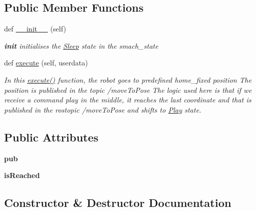 \subsection*{Public Member Functions}
\begin{DoxyCompactItemize}
\item 
def \hyperlink{classstate__behavior_1_1Sleep_a6550cf2697cc65d83162891ad194fe2d}{\+\_\+\+\_\+init\+\_\+\+\_\+} (self)
\begin{DoxyCompactList}\small\item\em {\bfseries init} initialises the \hyperlink{classstate__behavior_1_1Sleep}{Sleep} state in the smach\+\_\+state \end{DoxyCompactList}\item 
def \hyperlink{classstate__behavior_1_1Sleep_a79cf281b29f33265acc97354865a2f3c}{execute} (self, userdata)
\begin{DoxyCompactList}\small\item\em In this \hyperlink{classstate__behavior_1_1Sleep_a79cf281b29f33265acc97354865a2f3c}{execute()} function, the robot goes to predefined home\+\_\+fixed position The position is published in the topic /move\+To\+Pose The logic used here is that if we receive a command play in the middle, it reaches the last coordinate and that is published in the rostopic /move\+To\+Pose and shifts to \hyperlink{classstate__behavior_1_1Play}{Play} state. \end{DoxyCompactList}\end{DoxyCompactItemize}
\subsection*{Public Attributes}
\begin{DoxyCompactItemize}
\item 
\mbox{\label{classstate__behavior_1_1Sleep_abd6af3621ac6fd6caab94e5ebd1d87ad}} 
{\bfseries pub}
\item 
\mbox{\label{classstate__behavior_1_1Sleep_a937ce4dfca4da54cb10ea6c00fa01bee}} 
{\bfseries is\+Reached}
\end{DoxyCompactItemize}


\subsection{Constructor \& Destructor Documentation}
\mbox{\label{classstate__behavior_1_1Sleep_a6550cf2697cc65d83162891ad194fe2d}} 

